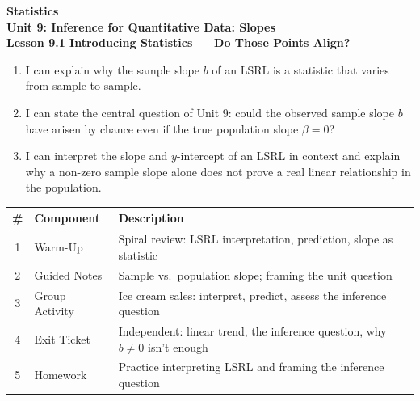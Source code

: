 \documentclass[10pt]{article}
\begin{document}
\vspace{-0.8in}

\begin{center}
  {\color{white}\textbf{\LARGE Statistics}}\\[4pt]
  {\color{skymid}\large\textbf{Unit 9: Inference for Quantitative Data: Slopes}}\\[6pt]
  {\color{white}\textbf{\large Lesson 9.1 \quad Introducing Statistics --- Do Those Points Align?}}
\end{center}

\vspace{0.22in}
\namedateperiod
\vspace{0.18in}

\begin{learningtargetbox}
\small
\begin{enumerate}[leftmargin=1.5em, itemsep=5pt]
  \item I can explain why the sample slope $b$ of an LSRL is a statistic that
        varies from sample to sample.
  \item I can state the central question of Unit 9: could the observed sample
        slope $b$ have arisen by chance even if the true population slope
        $\beta = 0$?
  \item I can interpret the slope and $y$-intercept of an LSRL in context and
        explain why a non-zero sample slope alone does not prove a real linear
        relationship in the population.
\end{enumerate}
\end{learningtargetbox}

\vspace{0.14in}

\begin{tocbox}
\small
\renewcommand{\arraystretch}{1.5}
\begin{tabularx}{\linewidth}{@{} c l X @{}}
\rowcolor{sky}
\textbf{\#} & \textbf{Component} & \textbf{Description} \\
\midrule
1 & Warm-Up        & Spiral review: LSRL interpretation, prediction, slope as statistic \\
2 & Guided Notes   & Sample vs.\ population slope; framing the unit question \\
3 & Group Activity & Ice cream sales: interpret, predict, assess the inference question \\
4 & Exit Ticket    & Independent: linear trend, the inference question, why $b \ne 0$ isn't enough \\
5 & Homework       & Practice interpreting LSRL and framing the inference question \\
\end{tabularx}
\end{tocbox}
\end{document}
